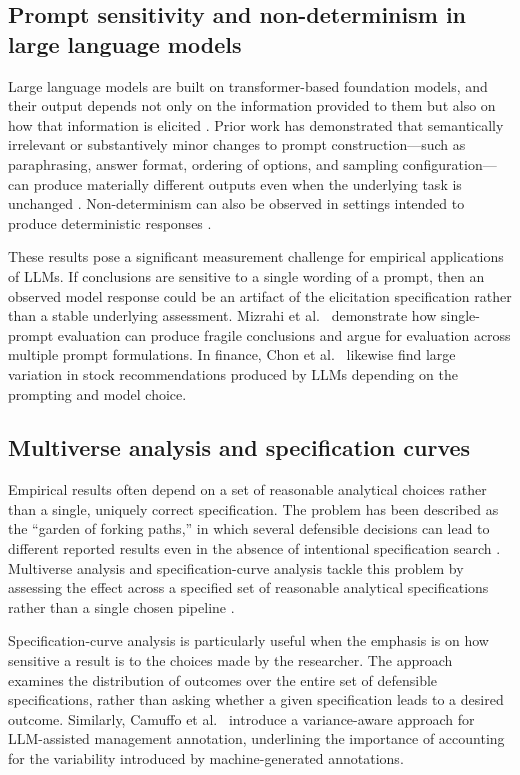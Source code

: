 \documentclass[pdflatex,sn-nature,lineno]{sn-jnl}
\theoremstyle{thmstyleone}
\begin{document}
\subsection{Prompt sensitivity and non-determinism in large language models}
Large language models are built on transformer-based foundation models, and their output depends not only
on the information provided to them but also on how that information is elicited
\cite{vaswani2017attention,devlin2019bert,bommasani2021foundation}. Prior work has demonstrated that
semantically irrelevant or substantively minor changes to prompt construction---such as paraphrasing,
answer format, ordering of options, and sampling configuration---can produce materially different outputs
even when the underlying task is unchanged \cite{atil2024nondeterminism,sclar2024formatspread}.
Non-determinism can also be observed in settings intended to produce deterministic responses
\cite{atil2024nondeterminism}.

These results pose a significant measurement challenge for empirical applications of LLMs. If conclusions
are sensitive to a single wording of a prompt, then an observed model response could be an artifact of
the elicitation specification rather than a stable underlying assessment. Mizrahi et
al.\ \cite{mizrahi2024multiprompt} demonstrate how single-prompt evaluation can produce fragile
conclusions and argue for evaluation across multiple prompt formulations. In finance, Chon et
al.\ \cite{chon2025variability} likewise find large variation in stock recommendations produced by LLMs
depending on the prompting and model choice.

\subsection{Multiverse analysis and specification curves}
Empirical results often depend on a set of reasonable analytical choices rather than a single, uniquely
correct specification. The problem has been described as the ``garden of forking paths,'' in which
several defensible decisions can lead to different reported results even in the absence of intentional
specification search \cite{gelman2013garden,simmons2011false}. Multiverse analysis and
specification-curve analysis tackle this problem by assessing the effect across a specified set of
reasonable analytical specifications rather than a single chosen pipeline
\cite{steegen2016multiverse,simonsohn2020specification}.

Specification-curve analysis is particularly useful when the emphasis is on how sensitive a result is to
the choices made by the researcher. The approach examines the distribution of outcomes over the entire
set of defensible specifications, rather than asking whether a given specification leads to a desired
outcome. Similarly, Camuffo et al.\ \cite{camuffo2026variance} introduce a variance-aware approach for
LLM-assisted management annotation, underlining the importance of accounting for the variability
introduced by machine-generated annotations.
\end{document}
